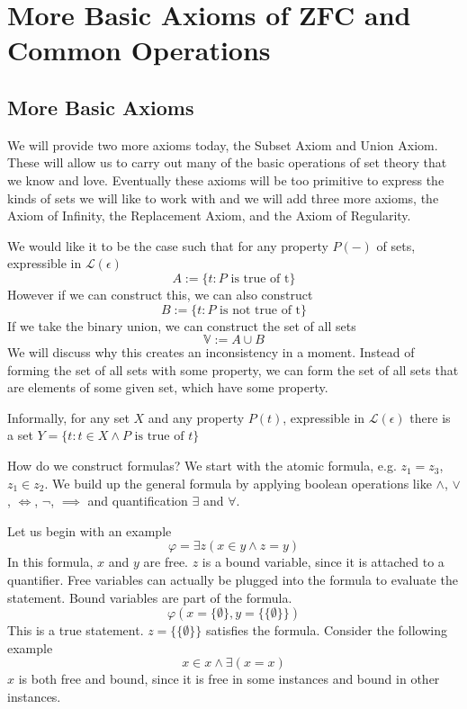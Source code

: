 
\section{More Basic Axioms of ZFC and Common Operations}
\subsection{More Basic Axioms}
We will provide two more axioms today, the Subset Axiom and Union Axiom. These will allow us to carry out many of the basic operations of set theory that we know and love. Eventually these axioms will be too primitive to express the kinds of sets we will like to work with and we will add three more axioms, the Axiom of Infinity, the Replacement Axiom, and the Axiom of Regularity.
\begin{rem}
We would like it to be the case such that for any property $P(-)$ of sets, expressible in $\mathscr{L}(\epsilon)$
\[A := \{t: P \text{ is true of t}\}\]
However if we can construct this, we can also construct
\[B := \{t: P \text{ is not true of t}\}\]
If we take the binary union, we can construct the set of all sets
\[\mathbb{V} := A \cup B\]
We will discuss why this creates an inconsistency in a moment. Instead of forming the set of all sets with some property, we can form the set of all sets that are elements of some given set, which have some property.
\end{rem}
\begin{rem}
Informally, for any set $X$ and any property $P(t)$, expressible in $\mathscr{L}(\epsilon)$ there is a set $Y = \{t: t \in X \wedge P \text{ is true of }t\}$
\end{rem}
\begin{rem}[Formulas]
How do we construct formulas? We start with the atomic formula, e.g. $z_1 = z_3$, $z_1 \in z_2$. We build up the general formula by applying boolean operations like $\wedge$, $\vee$, $\iff$, $\neg$, $\implies$ and quantification $\exists$ and $\forall$.
\end{rem}
\begin{rem}
Let us begin with an example
\[\varphi = \exists z (x \in y \wedge z = y)\]
In this formula, $x$ and $y$ are free. $z$ is a bound variable, since it is attached to a quantifier. Free variables can actually be plugged into the formula to evaluate the statement. Bound variables are part of the formula.
\[\varphi(x=\{\emptyset\}, y=\{\{\emptyset\}\})\]
This is a true statement. $z = \{\{\emptyset\}\}$ satisfies the formula. Consider the following example
\[x \in x \wedge \exists (x = x)\]
$x$ is both free and bound, since it is free in some instances and bound in other instances.
\end{rem}
